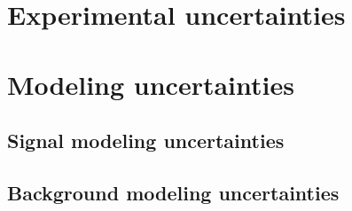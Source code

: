 \documentclass[../thesis.tex]{subfiles}
\begin{document}
\vspace{-1\baselineskip}

\section{Experimental uncertainties}
\label{sec:sysexp}


\section{Modeling uncertainties}
\label{sec:sysmod}
\subsection{Signal modeling uncertainties}
\subsection{Background modeling uncertainties}
\end{document}
